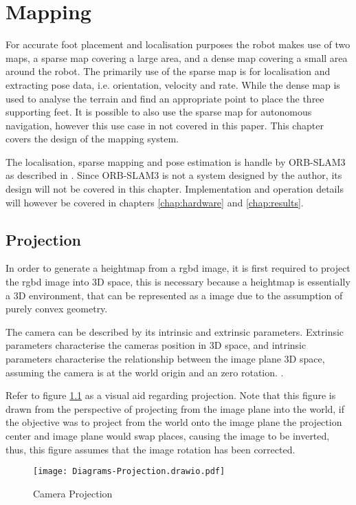 \chapter{Mapping} \label{chap:mapping}
For accurate foot placement and localisation purposes the robot makes use of two maps, a sparse map covering a large area, and a dense map covering a small
area around the robot. The primarily use of the sparse map is for localisation and extracting pose data, i.e. orientation, velocity and rate. While the dense
map is used to analyse the terrain and find an appropriate point to place the three supporting feet.
It is possible to also use the sparse map for autonomous navigation, however this use case in not covered in this paper.
This chapter covers the design of the mapping system.

The localisation, sparse mapping and pose estimation is handle by ORB-SLAM3 as described in \cite{campos2021orb}. Since ORB-SLAM3 is not a system designed by the author, its
design will not be covered in this chapter. Implementation and operation details will however be covered in chapters \ref{chap:hardware} and \ref{chap:results}.

\section{Projection}
In order to generate a heightmap from a \ac{rgbd} image, it is first required to project the \ac{rgbd} image into 3D space, this is necessary because a heightmap is essentially a 3D environment,
that can be represented as a image due to the assumption of purely convex geometry. 

The camera can be described by its intrinsic and extrinsic parameters. Extrinsic parameters characterise the
cameras position in 3D space, and intrinsic parameters characterise the relationship between the image plane 3D space, 
assuming the camera is at the world origin and an zero rotation. \cite{hartley2003multiple}.

\newpage
\noindent
Refer to figure \ref{fig:projection} as a visual aid regarding projection. Note that this figure is drawn from the perspective of projecting from the image plane into the world,
if the objective was to project from the world onto the image plane the projection center and image plane would swap places, causing the image to be inverted, thus, this figure assumes
that the image rotation has been corrected.
\begin{figure}[h]
    \centering
    \texttt{[image: Diagrams-Projection.drawio.pdf]}
    \caption{Camera Projection}
    \label{fig:projection}
\end{figure}

